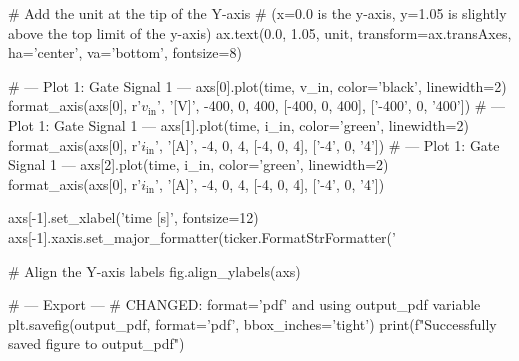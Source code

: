     # Add the unit at the tip of the Y-axis
    # (x=0.0 is the y-axis, y=1.05 is slightly above the top limit of the y-axis)
    ax.text(0.0, 1.05, unit, transform=ax.transAxes, ha='center', va='bottom', fontsize=8)

    # --- Plot 1: Gate Signal 1 ---
axs[0].plot(time, v_in, color='black', linewidth=2)
format_axis(axs[0], r'$v_{\mathrm{in}}$', '[V]', -400, 0, 400, [-400, 0, 400], ['-400', 0, '400'])
  # --- Plot 1: Gate Signal 1 ---
axs[1].plot(time, i_in, color='green', linewidth=2)
format_axis(axs[0], r'$i_{\mathrm{in}}$', '[A]', -4, 0, 4, [-4, 0, 4], ['-4', 0, '4'])
  # --- Plot 1: Gate Signal 1 ---
axs[2].plot(time, i_in, color='green', linewidth=2)
format_axis(axs[0], r'$i_{\mathrm{in}}$', '[A]', -4, 0, 4, [-4, 0, 4], ['-4', 0, '4'])

axs[-1].set_xlabel('time [s]', fontsize=12)
axs[-1].xaxis.set_major_formatter(ticker.FormatStrFormatter('%

# Align the Y-axis labels
fig.align_ylabels(axs)

# --- Export ---
# CHANGED: format='pdf' and using output_pdf variable
plt.savefig(output_pdf, format='pdf', bbox_inches='tight')
print(f"Successfully saved figure to {output_pdf}")
